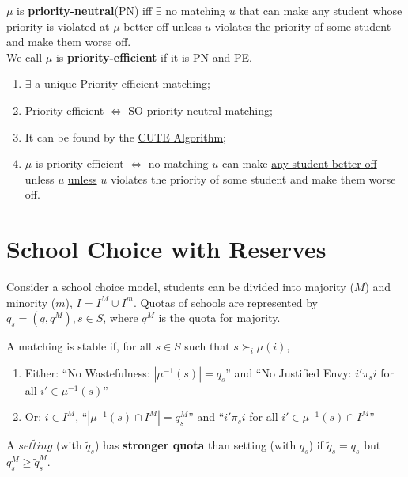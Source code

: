 \documentclass[11pt]{elegantbook}
\begin{document}
\begin{definition}
    \normalfont
    $\mu$ is \textbf{priority-neutral}(PN) iff $\exists$ no matching $u$ that can make any student whose priority is violated at $\mu$ better off \underline{unless} $u$ violates the priority of some student and make them worse off.\\
    We call $\mu$ is \textbf{priority-efficient} if it is PN and PE.
\end{definition}

\begin{theorem}[Reny 2022]
    \begin{enumerate}
        \item $\exists$ a unique Priority-efficient matching;
        \item Priority efficient $\Leftrightarrow$ SO priority neutral matching;
        \item It can be found by the \underline{CUTE Algorithm};
        \item $\mu$ is priority efficient $\Leftrightarrow$ no matching $u$ can make \underline{any student better off} unless $u$ \underline{unless} $u$ violates the priority of some student and make them worse off.
    \end{enumerate}
\end{theorem}


\section{School Choice with Reserves}
Consider a school choice model, students can be divided into majority ($M$) and minority ($m$), $I=I^M\cup I^m$. Quotas of schools are represented by $q_s=(q,q^M), s\in S$, where $q^M$ is the quota for majority.

\begin{definition}[Stability]
    \normalfont
    A matching is stable if, for all $s\in S$ such that $s\succ_i \mu(i)$,
    \begin{enumerate}
        \item Either: ``No Wastefulness: $|\mu^{-1}(s)| = q_s$'' and ``No Justified Envy: $i'\pi_s i$ for all $i'\in \mu^{-1}(s)$''
        \item Or: $i\in I^M$, ``$|\mu^{-1}(s)\cap I^M| = q_s^M$'' and ``$i'\pi_s i$ for all $i'\in \mu^{-1}(s)\cap I^M$''
    \end{enumerate}
\end{definition}

\begin{definition}
    \normalfont
    A $\tilde{setting}$ (with $\tilde{q}_s$) has \textbf{stronger quota} than setting (with $q_s$) if $\tilde{q}_s=q_s$ but $q_s^M\geq \tilde{q}_s^M$.
\end{definition}
\end{document}
